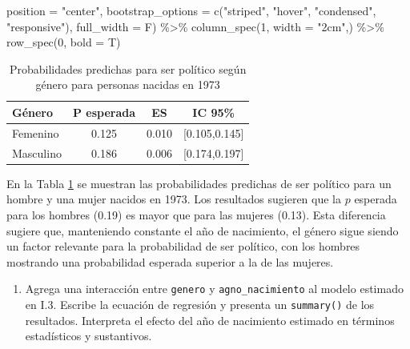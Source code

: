 \documentclass[
  12pt,
  a4paper,
]{article}
\newenvironment{Shaded}{\begin{snugshade}}{\end{snugshade}}
\newcommand{\AttributeTok}[1]{\textcolor[rgb]{0.77,0.63,0.00}{#1}}
\newcommand{\DecValTok}[1]{\textcolor[rgb]{0.00,0.00,0.81}{#1}}
\newcommand{\FunctionTok}[1]{\textcolor[rgb]{0.00,0.00,0.00}{#1}}
\newcommand{\NormalTok}[1]{#1}
\newcommand{\SpecialCharTok}[1]{\textcolor[rgb]{0.00,0.00,0.00}{#1}}
\newcommand{\StringTok}[1]{\textcolor[rgb]{0.31,0.60,0.02}{#1}}
\providecommand{\tightlist}{%
  \setlength{\itemsep}{0pt}\setlength{\parskip}{0pt}}
\begin{document}
\begin{Shaded}
\begin{Highlighting}[]
                            \AttributeTok{position =} \StringTok{"center"}\NormalTok{, }
                            \AttributeTok{bootstrap\_options =} \FunctionTok{c}\NormalTok{(}\StringTok{"striped"}\NormalTok{, }\StringTok{"hover"}\NormalTok{, }
                                                  \StringTok{"condensed"}\NormalTok{, }\StringTok{"responsive"}\NormalTok{), }
                            \AttributeTok{full\_width =}\NormalTok{ F) }\SpecialCharTok{\%\textgreater{}\%} 
  \FunctionTok{column\_spec}\NormalTok{(}\DecValTok{1}\NormalTok{, }\AttributeTok{width =} \StringTok{"2cm"}\NormalTok{,) }\SpecialCharTok{\%\textgreater{}\%}
  \FunctionTok{row\_spec}\NormalTok{(}\DecValTok{0}\NormalTok{, }\AttributeTok{bold =}\NormalTok{ T)}
\end{Highlighting}
\end{Shaded}

\begin{table}[!h]

\caption{\label{tab:table3}\label{tab:table3} Probabilidades predichas para ser político 
                                    según género para personas nacidas en 1973}
\centering
\begin{tabular}[t]{>{\centering\arraybackslash}p{2cm}ccc}
\toprule
\textbf{Género} & \textbf{P esperada} & \textbf{ES} & \textbf{IC 95\%}\\
\midrule
Femenino & 0.125 & 0.010 & {}[0.105,0.145]\\
Masculino & 0.186 & 0.006 & {}[0.174,0.197]\\
\bottomrule
\end{tabular}
\end{table}

En la Tabla \ref{tab:table3} se muestran las probabilidades predichas de ser político para un hombre y una mujer nacidos en 1973. Los resultados sugieren que la \(p\) esperada para los hombres (0.19) es mayor que para las mujeres (0.13). Esta diferencia sugiere que, manteniendo constante el año de nacimiento, el género sigue siendo un factor relevante para la probabilidad de ser político, con los hombres mostrando una probabilidad esperada superior a la de las mujeres.

\begin{enumerate}
\def\labelenumi{\arabic{enumi}.}
\setcounter{enumi}{5}
\tightlist
\item
  Agrega una interacción entre \texttt{genero} y \texttt{agno\_nacimiento} al modelo estimado en I.3. Escribe la ecuación de regresión y presenta un \texttt{summary()} de los resultados. Interpreta el efecto del año de nacimiento estimado en términos estadísticos y sustantivos.
\end{enumerate}
\end{document}
